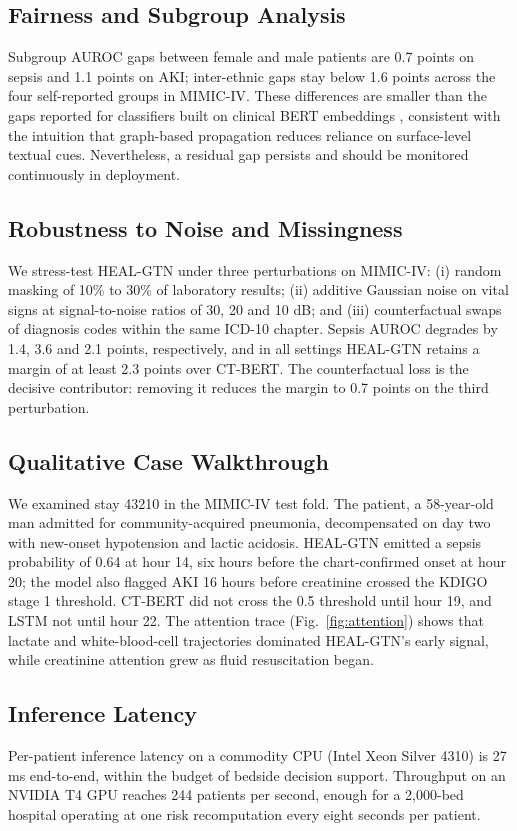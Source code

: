 \documentclass[conference]{IEEEtran}
\begin{document}
\subsection{Fairness and Subgroup Analysis}\label{sec:fairness}
Subgroup AUROC gaps between female and male patients are 0.7 points on sepsis and 1.1 points on AKI; inter-ethnic gaps stay below 1.6 points across the four self-reported groups in MIMIC-IV. These differences are smaller than the gaps reported for classifiers built on clinical BERT embeddings \cite{zhang2020hurtful}, consistent with the intuition that graph-based propagation reduces reliance on surface-level textual cues. Nevertheless, a residual gap persists and should be monitored continuously in deployment.

\subsection{Robustness to Noise and Missingness}\label{sec:robust}
We stress-test HEAL-GTN under three perturbations on MIMIC-IV: (i) random masking of 10\% to 30\% of laboratory results; (ii) additive Gaussian noise on vital signs at signal-to-noise ratios of 30, 20 and 10 dB; and (iii) counterfactual swaps of diagnosis codes within the same ICD-10 chapter. Sepsis AUROC degrades by 1.4, 3.6 and 2.1 points, respectively, and in all settings HEAL-GTN retains a margin of at least 2.3 points over CT-BERT. The counterfactual loss is the decisive contributor: removing it reduces the margin to 0.7 points on the third perturbation.

\subsection{Qualitative Case Walkthrough}
We examined stay 43210 in the MIMIC-IV test fold. The patient, a 58-year-old man admitted for community-acquired pneumonia, decompensated on day two with new-onset hypotension and lactic acidosis. HEAL-GTN emitted a sepsis probability of 0.64 at hour 14, six hours before the chart-confirmed onset at hour 20; the model also flagged AKI 16 hours before creatinine crossed the KDIGO stage 1 threshold. CT-BERT did not cross the 0.5 threshold until hour 19, and LSTM not until hour 22. The attention trace (Fig.~\ref{fig:attention}) shows that lactate and white-blood-cell trajectories dominated HEAL-GTN's early signal, while creatinine attention grew as fluid resuscitation began.

\subsection{Inference Latency}
Per-patient inference latency on a commodity CPU (Intel Xeon Silver 4310) is 27 ms end-to-end, within the budget of bedside decision support. Throughput on an NVIDIA T4 GPU reaches 244 patients per second, enough for a 2,000-bed hospital operating at one risk recomputation every eight seconds per patient.
\end{document}
